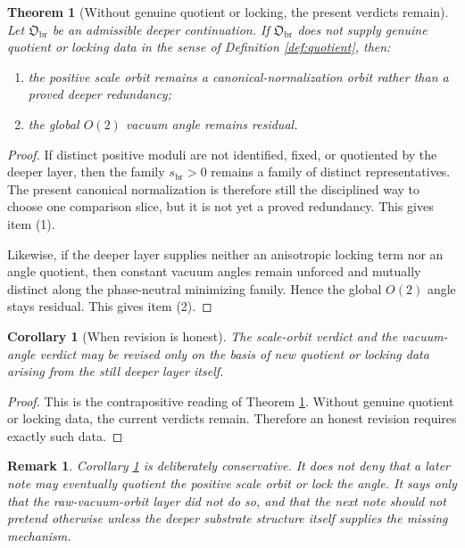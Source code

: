 \documentclass[11pt]{article}
\newcommand{\DeepSector}{\mathfrak O_{\mathrm{br}}}
\newcommand{\ScaleMod}{s_{\mathrm{br}}}
\newtheorem{remark}{Remark}
\newtheorem{corollary}{Corollary}
\newtheorem{theorem}{Theorem}
\begin{document}
\begin{theorem}[Without genuine quotient or locking, the present verdicts remain]
\label{thm:status}
Let \(\DeepSector\) be an admissible deeper continuation. If \(\DeepSector\) does not supply genuine quotient or locking data in the sense of Definition \ref{def:quotient}, then:
\begin{enumerate}
    \item the positive scale orbit remains a canonical-normalization orbit rather than a proved deeper redundancy;
    \item the global \(O(2)\) vacuum angle remains residual.
\end{enumerate}
\end{theorem}

\begin{proof}
If distinct positive moduli are not identified, fixed, or quotiented by the deeper layer, then the family \(\ScaleMod>0\) remains a family of distinct representatives. The present canonical normalization is therefore still the disciplined way to choose one comparison slice, but it is not yet a proved redundancy. This gives item (1).

Likewise, if the deeper layer supplies neither an anisotropic locking term nor an angle quotient, then constant vacuum angles remain unforced and mutually distinct along the phase-neutral minimizing family. Hence the global \(O(2)\) angle stays residual. This gives item (2).
\end{proof}

\begin{corollary}[When revision is honest]
\label{cor:revision}
The scale-orbit verdict and the vacuum-angle verdict may be revised only on the basis of new quotient or locking data arising from the still deeper layer itself.
\end{corollary}

\begin{proof}
This is the contrapositive reading of Theorem \ref{thm:status}. Without genuine quotient or locking data, the current verdicts remain. Therefore an honest revision requires exactly such data.
\end{proof}

\begin{remark}
Corollary \ref{cor:revision} is deliberately conservative. It does not deny that a later note may eventually quotient the positive scale orbit or lock the angle. It says only that the raw-vacuum-orbit layer did not do so, and that the next note should not pretend otherwise unless the deeper substrate structure itself supplies the missing mechanism.
\end{remark}
\end{document}
